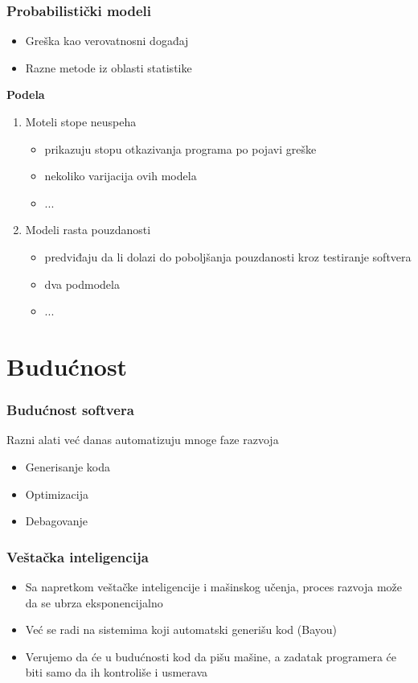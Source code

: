 \documentclass{beamer}
\begin{document}
\begin{frame}
\frametitle{Probabilistički modeli}

\begin{itemize}

\item Greška kao verovatnosni događaj
\item Razne metode iz oblasti statistike

\end{itemize}

\textbf{Podela}
\begin{enumerate}
\item Moteli stope neuspeha
\begin{itemize}
\item prikazuju stopu otkazivanja programa po pojavi greške
\item nekoliko varijacija ovih modela
\item ...
\end{itemize}
\item Modeli rasta pouzdanosti
\begin{itemize}
\item predviđaju da li dolazi do poboljšanja pouzdanosti kroz testiranje softvera
\item dva podmodela
\item ...
\end{itemize}
\end{enumerate}

\end{frame}

\section{Budućnost}
\begin{frame}
\frametitle{Budućnost softvera}

Razni alati već danas automatizuju mnoge faze razvoja
\begin{itemize}
\item Generisanje koda
\item Optimizacija
\item Debagovanje
\end{itemize}
\end{frame}

\begin{frame}
\frametitle{Veštačka inteligencija}

\begin{itemize}
\item Sa napretkom veštačke inteligencije i mašinskog učenja, proces razvoja može da se ubrza eksponencijalno
\item Već se radi na sistemima koji automatski generišu kod (Bayou)
\item Verujemo da će u budućnosti kod da pišu mašine, a zadatak programera će biti samo da ih kontroliše i usmerava
\end{itemize}
\end{frame}
\end{document}
